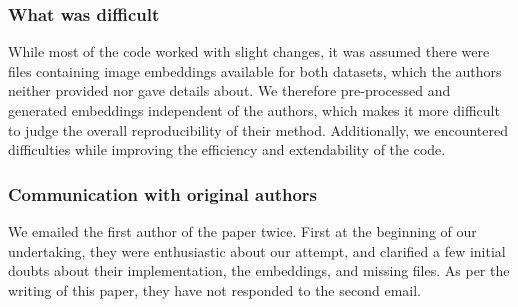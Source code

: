 \subsubsection*{What was difficult}
While most of the code worked with slight changes, it was assumed there were files containing image embeddings available for both datasets, which the authors neither provided nor gave details about. We therefore pre-processed and generated embeddings independent of the authors, which makes it more difficult to judge the overall reproducibility of their method. Additionally, we encountered difficulties while improving the efficiency and extendability of the code.

\subsubsection*{Communication with original authors}
We emailed the first author of the paper twice. First at the beginning of our undertaking, they were enthusiastic about our attempt, and clarified a few initial doubts about their implementation, the embeddings, and missing files. As per the writing of this paper, they have not responded to the second email.